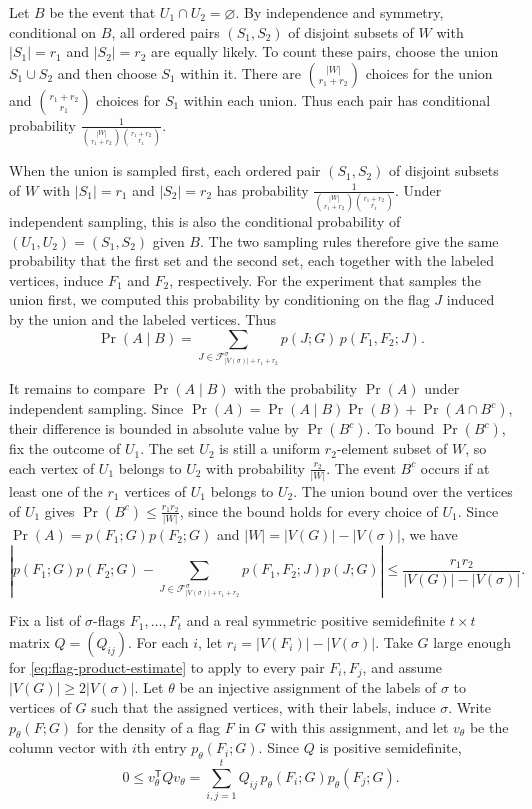 \documentclass[preprint,11pt,numbers]{elsarticle-arxiv}
\numberwithin{equation}{section}
\theoremstyle{definition}
\begin{document}
Let $B$ be the event that $U_1\cap U_2=\varnothing$. By
independence and symmetry, conditional on $B$, all ordered
pairs $(S_1,S_2)$ of disjoint subsets of $W$ with $|S_1|=r_1$
and $|S_2|=r_2$ are equally likely. To count these pairs, choose
the union $S_1\cup S_2$ and then choose $S_1$ within it. There
are $\binom{|W|}{r_1+r_2}$ choices for the union and
$\binom{r_1+r_2}{r_1}$ choices for $S_1$ within each union.
Thus each pair has conditional probability
$\frac{1}{\binom{|W|}{r_1+r_2}\binom{r_1+r_2}{r_1}}$.

When the union is sampled first, each ordered pair $(S_1,S_2)$
of disjoint subsets of $W$ with $|S_1|=r_1$ and $|S_2|=r_2$
has probability
$\frac{1}{\binom{|W|}{r_1+r_2}\binom{r_1+r_2}{r_1}}$.
Under independent sampling, this is also the conditional
probability of $(U_1,U_2)=(S_1,S_2)$ given $B$. The two sampling
rules therefore give the same probability that the first set
and the second set, each together with the labeled vertices,
induce $F_1$ and $F_2$, respectively. For the experiment that
samples the union first, we computed this probability by
conditioning on the flag $J$ induced by the union and the
labeled vertices. Thus
\[
  \Pr(A\mid B)
  =\sum_{J\in\mathcal F^\sigma_{|V(\sigma)|+r_1+r_2}}
    p(J;G)\,p(F_1,F_2;J).
\]

It remains to compare $\Pr(A\mid B)$ with the probability $\Pr(A)$
under independent sampling. Since
$\Pr(A)=\Pr(A\mid B)\Pr(B)+\Pr(A\cap B^c)$, their difference is
bounded in absolute value by $\Pr(B^c)$. To bound $\Pr(B^c)$,
fix the outcome of $U_1$. The set $U_2$ is still a uniform
$r_2$-element subset of $W$, so each vertex of $U_1$ belongs
to $U_2$ with probability $\frac{r_2}{|W|}$. The event $B^c$
occurs if at least one of the $r_1$ vertices of $U_1$ belongs
to $U_2$. The union bound over the vertices of $U_1$ gives
$\Pr(B^c)\leq\frac{r_1r_2}{|W|}$, since the bound holds for every
choice of $U_1$. Since $\Pr(A)=p(F_1;G)p(F_2;G)$ and
$|W|=|V(G)|-|V(\sigma)|$, we have
\begin{equation}\label{eq:flag-product-estimate}
  \left|
    p(F_1;G)p(F_2;G)
    -\sum_{J\in\mathcal F^\sigma_{|V(\sigma)|+r_1+r_2}}
        p(F_1,F_2;J)p(J;G)
  \right|
  \leq \frac{r_1r_2}{|V(G)|-|V(\sigma)|}.
\end{equation}

Fix a list of $\sigma$-flags $F_1,\ldots,F_t$ and a real
symmetric positive semidefinite $t\times t$ matrix $Q=(Q_{ij})$.
For each $i$, let $r_i=|V(F_i)|-|V(\sigma)|$. Take $G$ large
enough for \eqref{eq:flag-product-estimate} to apply to every
pair $F_i,F_j$, and assume $|V(G)|\geq 2|V(\sigma)|$. Let
$\theta$ be an injective assignment of the labels of $\sigma$
to vertices of $G$ such that the assigned vertices, with
their labels, induce $\sigma$. Write $p_\theta(F;G)$ for
the density of a flag $F$ in $G$ with this assignment, and
let $v_\theta$ be the column vector with $i$th entry
$p_\theta(F_i;G)$. Since $Q$ is positive semidefinite,
\[
  0\leq v_\theta^{\mathsf T}Qv_\theta
    =\sum_{i,j=1}^{t}Q_{ij}\,
       p_\theta(F_i;G)p_\theta(F_j;G).
\]
\end{document}
